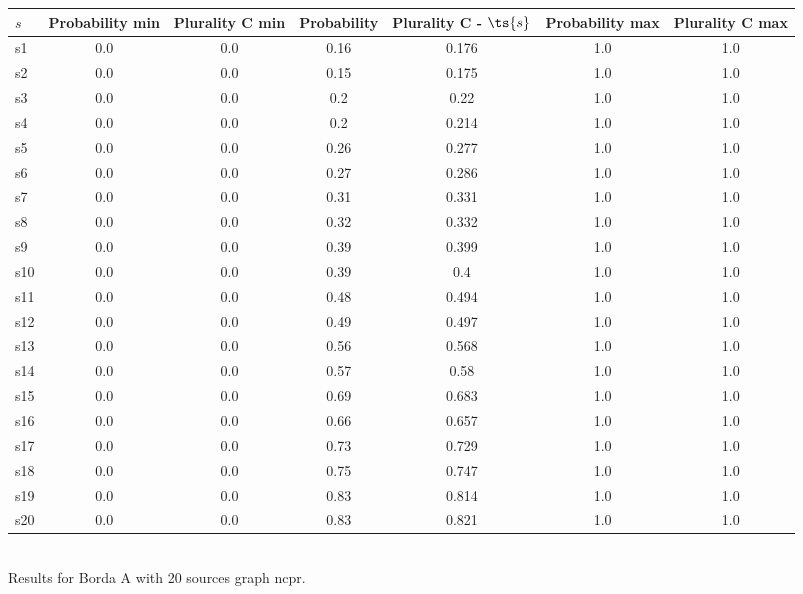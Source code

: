 \documentclass{article}
\begin{document}
\noindent\begin{tabular}{|l|c|c|c|c|c|c|}
\hline
$s$& Probability min & Plurality C min & Probability & Plurality C - $\ts{s}$ & Probability max & Plurality C max\\
\hline
s1 &0.0 & 0.0 & 0.16 & 0.176 & 1.0 & 1.0\\
\hline
s2 &0.0 & 0.0 & 0.15 & 0.175 & 1.0 & 1.0\\
\hline
s3 &0.0 & 0.0 & 0.2 & 0.22 & 1.0 & 1.0\\
\hline
s4 &0.0 & 0.0 & 0.2 & 0.214 & 1.0 & 1.0\\
\hline
s5 &0.0 & 0.0 & 0.26 & 0.277 & 1.0 & 1.0\\
\hline
s6 &0.0 & 0.0 & 0.27 & 0.286 & 1.0 & 1.0\\
\hline
s7 &0.0 & 0.0 & 0.31 & 0.331 & 1.0 & 1.0\\
\hline
s8 &0.0 & 0.0 & 0.32 & 0.332 & 1.0 & 1.0\\
\hline
s9 &0.0 & 0.0 & 0.39 & 0.399 & 1.0 & 1.0\\
\hline
s10 &0.0 & 0.0 & 0.39 & 0.4 & 1.0 & 1.0\\
\hline
s11 &0.0 & 0.0 & 0.48 & 0.494 & 1.0 & 1.0\\
\hline
s12 &0.0 & 0.0 & 0.49 & 0.497 & 1.0 & 1.0\\
\hline
s13 &0.0 & 0.0 & 0.56 & 0.568 & 1.0 & 1.0\\
\hline
s14 &0.0 & 0.0 & 0.57 & 0.58 & 1.0 & 1.0\\
\hline
s15 &0.0 & 0.0 & 0.69 & 0.683 & 1.0 & 1.0\\
\hline
s16 &0.0 & 0.0 & 0.66 & 0.657 & 1.0 & 1.0\\
\hline
s17 &0.0 & 0.0 & 0.73 & 0.729 & 1.0 & 1.0\\
\hline
s18 &0.0 & 0.0 & 0.75 & 0.747 & 1.0 & 1.0\\
\hline
s19 &0.0 & 0.0 & 0.83 & 0.814 & 1.0 & 1.0\\
\hline
s20 &0.0 & 0.0 & 0.83 & 0.821 & 1.0 & 1.0\\
\hline
\end{tabular}\\

\noindent Results for Borda A with 20 sources graph ncpr.
\end{document}
